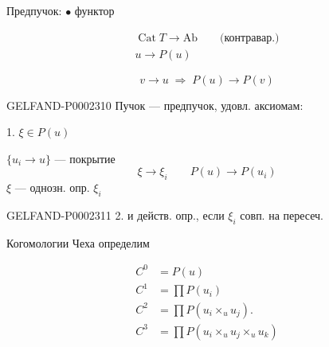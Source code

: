 Предпучок: $\bullet$ функтор



\begin{gather*}
 \operatorname{Cat}T\to\mathrm{Ab}\qquad\text{(контравар.)}\\
 u\to P(u)
\end{gather*}



\begin{equation*}
 v\to u\;\Rightarrow\;P(u)\to P(v)
\end{equation*}



\begin{GelfandAdjacentEvidence}{GELFAND-P000231}{0}
Пучок — предпучок, удовл. аксиомам:



1. $\xi\in P(u)$

$\{u_i\to u\}$ — покрытие
\begin{equation*}
 \xi\to\xi_i\qquad P(u)\to P(u_i)
\end{equation*}
$\xi$ — однозн. опр. $\xi_i$




\end{GelfandAdjacentEvidence}
\begin{GelfandAdjacentEvidence}{GELFAND-P000231}{1}
2. и действ. опр., если $\xi_i$ совп. на пересеч.







\end{GelfandAdjacentEvidence}

Когомологии Чеха определим



\begin{align*}
 C^0&=P(u)\\
 C^1&=\prod P(u_i)\\
 C^2&=\prod P(u_i\times_u u_j).\\
 C^3&=\prod P(u_i\times_u u_j\times_u u_k)
\end{align*}



